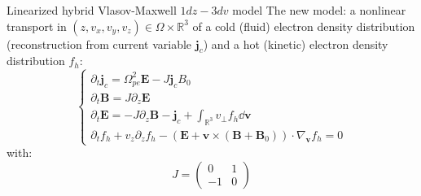 \documentclass{beamer}
\newcommand{\Mvb}[1]{\boldsymbol{#1}}
\begin{document}
\begin{frame}{Linearized hybrid Vlasov-Maxwell $1dz-3dv$ model}
  The new model: a nonlinear transport in $(z,v_x,v_y,v_z)\in\Omega\times\mathbb{R}^3$ of a cold (fluid) electron density distribution (reconstruction from current variable $\Mvb{j}_c$) and a hot (kinetic) electron density distribution $f_h$:
  $$
    \begin{cases}
      \partial_t\Mvb{j}_c = \Omega_{pe}^2\Mvb{E} - J\Mvb{j}_c B_0 \\
      \partial_t\Mvb{B}   = J\partial_z\Mvb{E} \\
      \partial_t\Mvb{E}   = -J\partial_z\Mvb{B} - \Mvb{j}_c + \int_{\mathbb{R}^3} v_\perp f_h\dd{\Mvb{v}} \\
      \partial_t f_h  + v_z\partial_z f_h - \left( \Mvb{E} + \Mvb{v}\times(\Mvb{B}+\Mvb{B}_0) \right)\cdot\nabla_{\Mvb{v}} f_h = 0
    \end{cases}
  $$
  with:
  $$
    J = \begin{pmatrix}
       0 & 1 \\
      -1 & 0
    \end{pmatrix}
  $$
\end{frame}

\end{document}
